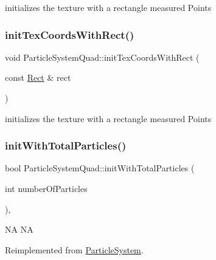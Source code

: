 initializes the texture with a rectangle measured Points \mbox{\label{classParticleSystemQuad_ac43c6847db3e8d44e422564496c94db3}} 
\subsubsection{\texorpdfstring{init\+Tex\+Coords\+With\+Rect()}{initTexCoordsWithRect()}\hspace{0.1cm}{\footnotesize\ttfamily [2/2]}}
{\footnotesize\ttfamily void Particle\+System\+Quad\+::init\+Tex\+Coords\+With\+Rect (\begin{DoxyParamCaption}\item[{const \hyperlink{classRect}{Rect} \&}]{rect }\end{DoxyParamCaption})\hspace{0.3cm}{\ttfamily [protected]}}

initializes the texture with a rectangle measured Points \mbox{\label{classParticleSystemQuad_ae5420007b57e909c05e7476a54fbfbe9}} 
\subsubsection{\texorpdfstring{init\+With\+Total\+Particles()}{initWithTotalParticles()}\hspace{0.1cm}{\footnotesize\ttfamily [1/2]}}
{\footnotesize\ttfamily bool Particle\+System\+Quad\+::init\+With\+Total\+Particles (\begin{DoxyParamCaption}\item[{int}]{number\+Of\+Particles }\end{DoxyParamCaption})\hspace{0.3cm}{\ttfamily [override]}, {\ttfamily [virtual]}}

NA  NA 

Reimplemented from \hyperlink{classParticleSystem_a93c417abb16ff11d24010833f9fc4b47}{Particle\+System}.



